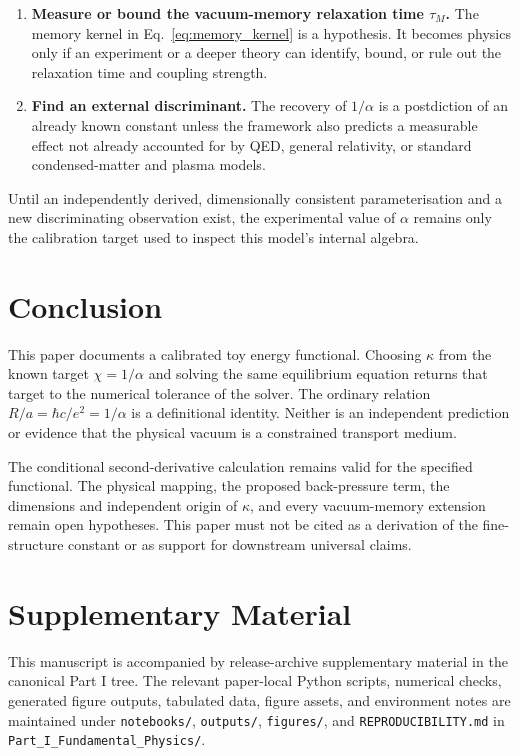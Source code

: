 \documentclass[11pt]{article}
\begin{document}
\begin{enumerate}
\item \textbf{Measure or bound the vacuum-memory relaxation time $\tau_M$.}
The memory kernel in Eq.~\eqref{eq:memory_kernel} is a hypothesis. It becomes
physics only if an experiment or a deeper theory can identify, bound, or rule out
the relaxation time and coupling strength.

\item \textbf{Find an external discriminant.}
The recovery of $1/\alpha$ is a postdiction of an already known constant unless
the framework also predicts a measurable effect not already accounted for by QED,
general relativity, or standard condensed-matter and plasma models.

\end{enumerate}

Until an independently derived, dimensionally consistent parameterisation and a
new discriminating observation exist, the experimental value of $\alpha$ remains
only the calibration target used to inspect this model's internal algebra.


\section{Conclusion}

This paper documents a calibrated toy energy functional. Choosing $\kappa$ from
the known target $\chi=1/\alpha$ and solving the same equilibrium equation
returns that target to the numerical tolerance of the solver. The ordinary
relation $R/a=\hbar c/e^2=1/\alpha$ is a definitional identity. Neither is an
independent prediction or evidence that the physical vacuum is a constrained
transport medium.

The conditional second-derivative calculation remains valid for the specified
functional. The physical mapping, the proposed back-pressure term, the
dimensions and independent origin of $\kappa$, and every vacuum-memory extension
remain open hypotheses. This paper must not be cited as a derivation of the
fine-structure constant or as support for downstream universal claims.


\section*{Supplementary Material}

This manuscript is accompanied by release-archive supplementary material in
the canonical Part I tree. The relevant paper-local Python scripts, numerical checks, generated figure outputs,
tabulated data, figure assets, and environment notes are maintained under
\texttt{notebooks/}, \texttt{outputs/}, \texttt{figures/}, and
\texttt{REPRODUCIBILITY.md} in \texttt{Part\_I\_Fundamental\_Physics/}.
\end{document}
